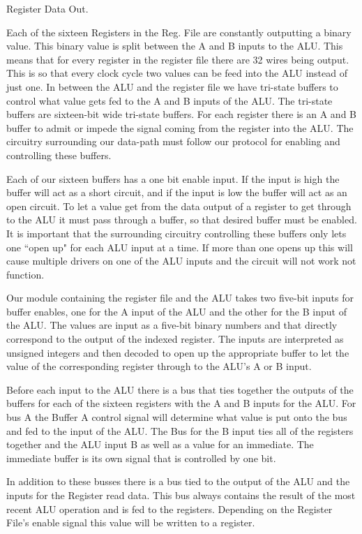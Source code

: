 \documentclass[onecolumn, 12pt]{IEEEtran}
\begin{document}
Register Data Out.  
\par
	Each of the sixteen Registers in the Reg. File are constantly outputting a binary value. This binary value is split between the A and B inputs to the ALU.  This means that for every register in the register file there are 32 wires being output. This is so that every clock cycle two values can be feed into the ALU instead of just one. In between the ALU and the register file we have tri-state buffers to control what value gets fed to the A and B inputs of the ALU. The tri-state buffers are sixteen-bit wide tri-state buffers. For each register there is an A and B buffer to admit or impede the signal coming from the register into the ALU. The circuitry surrounding our data-path must follow our protocol for enabling and controlling these buffers.
\par
Each of our sixteen buffers has a one bit enable input. If the input is high the buffer will act as a short circuit, and if the input is low the buffer will act as an open circuit. To let a value get from the data output of a register to get through to the ALU it must pass through a buffer, so that desired buffer must be enabled. It is important that the surrounding circuitry controlling these buffers only lets one ``open up" for each ALU input at a time. If more than one opens up this will cause multiple drivers on one of the ALU inputs and the circuit will not work not function.
\par
Our module containing the register file and the ALU takes two five-bit inputs for buffer enables, one for the A input of the ALU and the other for the B input of the ALU. The values are input as a five-bit binary numbers and that directly correspond to the output of the indexed register. The inputs are interpreted as unsigned integers and then decoded to open up the appropriate buffer to let the value of the corresponding register through to the ALU's A or B input.
\par
Before each input to the ALU there is a bus that ties together the outputs of the buffers for each of the sixteen registers with the A and B inputs for the ALU. For bus A the Buffer A control signal will determine what value is put onto the bus and fed to the input of the ALU. The Bus for the B input ties all of the registers together and the ALU input B as well as a value for an immediate. The immediate buffer is its own signal that is controlled by one bit.
\par
In addition to these busses there is a bus tied to the output of the ALU and the inputs for the Register read data. This bus always contains the result of the most recent ALU operation and is fed to the registers. Depending on the Register File's enable signal this value will be written to a register. 
\end{document}
